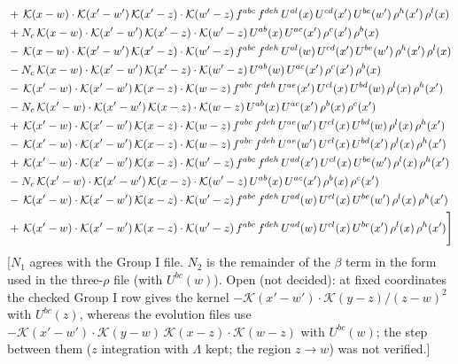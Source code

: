 \documentclass[9pt]{article}
\numberwithin{equation}{section}
\begin{document}
\begin{align}
& +\,\mathcal{K}(x-w)\cdot\mathcal{K}(x'-w')\,\mathcal{K}(x'-z)\cdot\mathcal{K}(w'-z)\,f^{abc}\,f^{deh}\,U^{al}(x)\,U^{cd}(x')\,U^{be}(w')\,\rho^{h}(x')\,\rho^{l}(x)\notag\\
& +N_{c}\,\mathcal{K}(x-w)\cdot\mathcal{K}(x'-w')\,\mathcal{K}(x'-z)\cdot\mathcal{K}(w'-z)\,U^{ab}(x)\,U^{ac}(x')\,\rho^{c}(x')\,\rho^{b}(x)\notag\\
& -\,\mathcal{K}(x-w)\cdot\mathcal{K}(x'-w')\,\mathcal{K}(x'-z)\cdot\mathcal{K}(w'-z)\,f^{abc}\,f^{deh}\,U^{al}(w)\,U^{cd}(x')\,U^{be}(w')\,\rho^{h}(x')\,\rho^{l}(x)\notag\\
& -N_{c}\,\mathcal{K}(x-w)\cdot\mathcal{K}(x'-w')\,\mathcal{K}(x'-z)\cdot\mathcal{K}(w'-z)\,U^{ab}(w)\,U^{ac}(x')\,\rho^{c}(x')\,\rho^{b}(x)\notag\\
& -\,\mathcal{K}(x'-w)\cdot\mathcal{K}(x'-w')\,\mathcal{K}(x-z)\cdot\mathcal{K}(w-z)\,f^{abc}\,f^{deh}\,U^{ae}(x')\,U^{cl}(x)\,U^{bd}(w)\,\rho^{l}(x)\,\rho^{h}(x')\notag\\
& -N_{c}\,\mathcal{K}(x'-w)\cdot\mathcal{K}(x'-w')\,\mathcal{K}(x-z)\cdot\mathcal{K}(w-z)\,U^{ab}(x)\,U^{ac}(x')\,\rho^{b}(x)\,\rho^{c}(x')\notag\\
& +\,\mathcal{K}(x'-w)\cdot\mathcal{K}(x'-w')\,\mathcal{K}(x-z)\cdot\mathcal{K}(w-z)\,f^{abc}\,f^{deh}\,U^{ae}(w')\,U^{cl}(x)\,U^{bd}(w)\,\rho^{l}(x)\,\rho^{h}(x')\notag\\
& -\,\mathcal{K}(x'-w)\cdot\mathcal{K}(x'-w')\,\mathcal{K}(x-z)\cdot\mathcal{K}(w-z)\,f^{abc}\,f^{deh}\,U^{ae}(w')\,U^{cl}(x)\,U^{bd}(x')\,\rho^{l}(x)\,\rho^{h}(x')\notag\\
& +\,\mathcal{K}(x'-w)\cdot\mathcal{K}(x'-w')\,\mathcal{K}(x-z)\cdot\mathcal{K}(w'-z)\,f^{abc}\,f^{deh}\,U^{ad}(x')\,U^{cl}(x)\,U^{be}(w')\,\rho^{l}(x)\,\rho^{h}(x')\notag\\
& -N_{c}\,\mathcal{K}(x'-w)\cdot\mathcal{K}(x'-w')\,\mathcal{K}(x-z)\cdot\mathcal{K}(w'-z)\,U^{ab}(x)\,U^{ac}(x')\,\rho^{b}(x)\,\rho^{c}(x')\notag\\
& -\,\mathcal{K}(x'-w)\cdot\mathcal{K}(x'-w')\,\mathcal{K}(x-z)\cdot\mathcal{K}(w'-z)\,f^{abc}\,f^{deh}\,U^{ad}(w)\,U^{cl}(x)\,U^{be}(w')\,\rho^{l}(x)\,\rho^{h}(x')\notag\\
& +\,\mathcal{K}(x'-w)\cdot\mathcal{K}(x'-w')\,\mathcal{K}(x-z)\cdot\mathcal{K}(w'-z)\,f^{abc}\,f^{deh}\,U^{ad}(w)\,U^{cl}(x)\,U^{be}(x')\,\rho^{l}(x)\,\rho^{h}(x')\Bigg]
\end{align} {\color{red}[$N_{1}$ agrees with the Group I file. $N_{2}$ is the remainder of the $\beta$ term in the form used in the three-$\rho$ file (with $U^{bc}(w)$). Open (not decided): at fixed coordinates the checked Group I row gives the kernel $-\mathcal{K}(x'-w')\cdot\mathcal{K}(y-z)/(z-w)^{2}$ with $U^{bc}(z)$, whereas the evolution files use $-\mathcal{K}(x'-w')\cdot\mathcal{K}(y-w)\,\mathcal{K}(x-z)\cdot\mathcal{K}(w-z)$ with $U^{bc}(w)$; the step between them ($z$ integration with $\Lambda$ kept; the region $z\to w$) was not verified.]}\par\noindent
\end{document}
